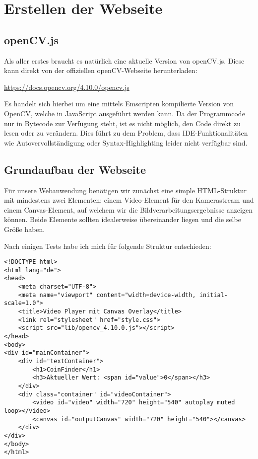 \section{Erstellen der Webseite}

\subsection{openCV.js}
Als aller erstes braucht es natürlich eine aktuelle Version von openCV.js. Diese kann direkt von der offiziellen openCV-Webseite herunterladen:

\href{https://docs.opencv.org/4.10.0/opencv.js}{https://docs.opencv.org/4.10.0/opencv.js}

Es handelt sich hierbei um eine mittels Emscripten kompilierte Version von OpenCV, welche in JavaScript ausgeführt werden kann. Da der Programmcode nur in Bytecode zur Verfügung steht, ist es nicht möglich, den Code direkt zu lesen oder zu verändern. Dies führt zu dem Problem, dass IDE-Funktionalitäten wie Autovervollständigung oder Syntax-Highlighting leider nicht verfügbar sind. 

\subsection{Grundaufbau der Webseite}
Für unsere Webanwendung benötigen wir zunächst eine simple HTML-Struktur mit mindestens zwei Elementen: einem Video-Element für den Kamerastream und einem Canvas-Element, auf welchem wir die Bildverarbeitungsergebnisse anzeigen können. Beide Elemente sollten idealerweise übereinander liegen und die selbe Größe haben.

Nach einigen Tests habe ich mich für folgende Struktur entschieden:
\begin{lstlisting}[style=HTML]
<!DOCTYPE html>
<html lang="de">
<head>
    <meta charset="UTF-8">
    <meta name="viewport" content="width=device-width, initial-scale=1.0">
    <title>Video Player mit Canvas Overlay</title>
    <link rel="stylesheet" href="style.css">
    <script src="lib/opencv_4.10.0.js"></script>
</head>
<body>
<div id="mainContainer">
    <div id="textContainer">
        <h1>CoinFinder</h1>
        <h3>Aktueller Wert: <span id="value">0</span></h3>
    </div>
    <div class="container" id="videoContainer">
        <video id="video" width="720" height="540" autoplay muted loop></video>
        <canvas id="outputCanvas" width="720" height="540"></canvas>
    </div>
</div>
</body>
</html>
\end{lstlisting}

